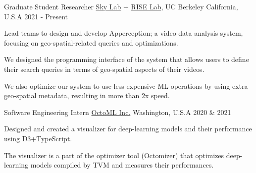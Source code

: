 

\begin{cventries}

  \cvwork
    {Graduate Student Researcher} %
    {\href{https://sky.cs.berkeley.edu/}{Sky Lab} + \href{https://rise.cs.berkeley.edu/}{RISE Lab}, UC Berkeley} %
    {California, U.S.A} %
    {2021 - Present} %
    {
      \begin{cvitems} %
        \item{Lead teams to design and develop Apperception; a video data analysis system, focusing on geo-spatial-related queries and optimizations.}
        \item{We designed the programming interface of the system that allows users to define their search queries in terms of geo-spatial aspects of their videos.}
        \item{We also optimize our system to use less expensive ML operations by using extra geo-spatial metadata, resulting in more than 2x speed.}
      \end{cvitems}
    }

  \cvwork
    {Software Engineering Intern} %
    {\href{https://octoml.ai/}{OctoML Inc.}} %
    {Washington, U.S.A} %
    {2020 \& 2021} %
    {
      \begin{cvitems} %
          \item{Designed and created a visualizer for deep-learning models and their performance using D3+TypeScript.}
          \item{The visualizer is a part of the optimizer tool (Octomizer) that optimizes deep-learning models compiled by TVM and measures their performances.}
      \end{cvitems}
    }


\end{cventries}
